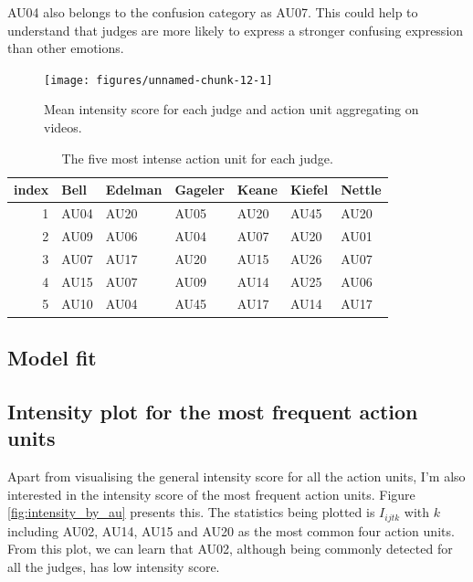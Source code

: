 \documentclass{monashthesis}
\begin{document}
AU04 also belongs to the confusion category as AU07. This could help to understand that judges are more likely to express a stronger confusing expression than other emotions.

\begin{figure}

{\centering \texttt{[image: figures/unnamed-chunk-12-1]} 

}

\caption{Mean intensity score for each judge and action unit aggregating on videos.\label{fig:mean_intensity}}\label{fig:unnamed-chunk-12}
\end{figure}

\begin{table}

\caption{\label{tab:unnamed-chunk-13}\label{tab:most_intense}The five most intense action unit for each judge.}
\centering
\begin{tabular}[t]{r|l|l|l|l|l|l}
\hline
index & Bell & Edelman & Gageler & Keane & Kiefel & Nettle\\
\hline
1 & AU04 & AU20 & AU05 & AU20 & AU45 & AU20\\
\hline
2 & AU09 & AU06 & AU04 & AU07 & AU20 & AU01\\
\hline
3 & AU07 & AU17 & AU20 & AU15 & AU26 & AU07\\
\hline
4 & AU15 & AU07 & AU09 & AU14 & AU25 & AU06\\
\hline
5 & AU10 & AU04 & AU45 & AU17 & AU14 & AU17\\
\hline
\end{tabular}
\end{table}

\hypertarget{model-fit}{%
\subsection{Model fit}\label{model-fit}}

\hypertarget{intensity-plot-for-the-most-frequent-action-units}{%
\subsection{Intensity plot for the most frequent action units}\label{intensity-plot-for-the-most-frequent-action-units}}

Apart from visualising the general intensity score for all the action units, I'm also interested in the intensity score of the most frequent action units. Figure \ref{fig:intensity_by_au} presents this. The statistics being plotted is \(I_{ijtk}\) with \(k\) including AU02, AU14, AU15 and AU20 as the most common four action units. From this plot, we can learn that AU02, although being commonly detected for all the judges, has low intensity score.
\end{document}
